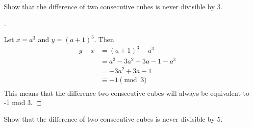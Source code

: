 \documentclass[11pt]{article}
\newenvironment{myproof}[1][\proofname]{%
  \begin{proof}[#1]$ $\par\nobreak\ignorespaces
}{%
  \end{proof}
}
\newenvironment{problem}[2][Problem]{\begin{trivlist}
\item[\hskip \labelsep {\bfseries #1}\hskip \labelsep {\bfseries #2.}]}{\end{trivlist}}
\begin{document}
\begin{problem}{14}
Show that the difference of two consecutive cubes is never divisible by 3.
\end{problem}

\begin{myproof}
    Let $x=a^3$ and $y=(a+1)^3$. Then
    \begin{align*}
        y - x & = (a+1)^3 - a^3           \\
              & = a^3 - 3a^2 + 3a -1 -a^3 \\
              & = - 3a^2 + 3a -1          \\
              & \equiv - 1 \pmod{3}       \\
    \end{align*}
    This means that the difference two consecutive cubes will always be equivalent to -1 mod 3.
\end{myproof}


\begin{problem}{15}
Show that the difference of two consecutive cubes is never divisible by 5.
\end{problem}
\end{document}
